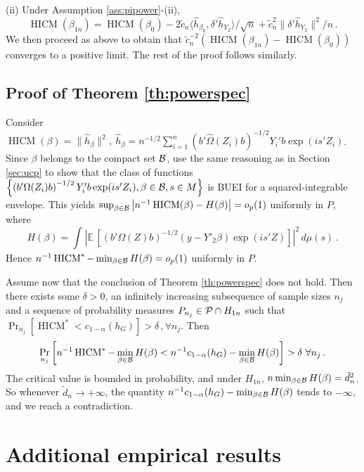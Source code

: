 \documentclass[12pt]{article}
\newcommand{\E}{\operatorname{E}}
\newcommand{\1}{\mathbf{1}}
\newcommand{\HICM}{\operatorname{HICM}}
\def\E{\mathbb{E}\,}
\newcommand{\ip}[2]{\langle #1,#2 \rangle}
\begin{document}
(ii) Under Assumption \ref{ass:pipower}-(ii),
\[
 \HICM (\beta_{1n})  =  \HICM (\beta_{0})
-  2 \tilde{c}_n \ip{\widehat{h}_{\beta_0}}{ \delta'  \widehat{h}_{Y_2} } /\sqrt{n}
+  \tilde{c}_n^2  \| \delta'   \widehat{h}_{Y_2} \|^{2} / n
\, .
\]
We then proceed  as above to obtain that $\tilde{c}_{n}^{-2} \left(
\HICM (\beta_{1n}) - \HICM (\beta_{0})
\right)$ converges to a positive limit. The rest of the proof follows
similarly.


\subsection{Proof of Theorem \ref{th:powerspec}}
Consider
$
\HICM (\beta)  = \| \widehat{h}_{\beta} \|^{2}, \
\widehat{h}_{\beta}  = n^{-1/2} \sum_{i=1}^{n}{\left(b'\widehat{\Omega}(Z_i)
b\right)^{-1/2} Y_i'b \exp(is'Z_i)}
$.
Since $\beta$ belongs to the compact set ${\cal B}$,  use the same reasoning
as in Section \ref{sec:ucp} to show that the class of functions
$\left\{\left(b'{\Omega}(Z_i) b\right)^{-1/2} Y_i'b \exp(is'Z_i),
\beta \in {\cal B}, s \in M \right\}$ is BUEI for a
squared-integrable envelope. This yields
$\sup_{\beta \in {\cal B}} \left|
n^{-1} \HICM (\beta) -  H(\beta) \right|  =
o_p(1)$ uniformly in $P$, where
\[
H(\beta) = \int_{}^{}{ \left| \E \left[ (b' \Omega(Z) b)^{-1/2}
(y - Y'_{2}\beta) \exp(is'Z)  \right] \right|^2 \, d\mu(s) }
\, .
\]
Hence
$
n^{-1}   \HICM^*  - \min_{\beta \in {\cal B}} H(\beta)   = o_p(1)
$
uniformly in $P$.

Assume now that the conclusion of Theorem \ref{th:powerspec} does not
hold. Then there exists some $\delta>0$, an infinitely increasing
subsequence of sample sizes $n_{j}$ and a sequence of probability
measures $P_{n_{j}} \in {\cal P} \cap H_{1n}$ such that
$
\Pr_{n_{j}} \left[ \HICM^{*} < c_{1-\alpha} (h_{{G}}) \right]
> \delta
\, ,   \forall n_{j}
$.
Then
\[
\Pr_{n_{j}} \left[ n^{-1}  \HICM^*  - \min_{\beta \in {\cal B}} H(\beta)    <
n^{-1} c_{1-\alpha} (h_{{G}})  -  \min_{\beta \in {\cal B}} H(\beta)
\right] > \delta \ \forall n_{j}
\, .
\]
The critical value is bounded in probability, and under $H_{1n}$, $ n
\min_{\beta \in {\cal B}}
H(\beta)= \tilde{d}_n^{2}$. So whenever $\tilde{d}_n \rightarrow + \infty$, the
quantity $n^{-1} c_{1-\alpha} (h_{{G}})  -  \min_{\beta \in {\cal B}}
H(\beta)$ tends to $-\infty$, and we reach a contradiction.



\section{Additional empirical results}
\label{sec:appfig}
\end{document}
